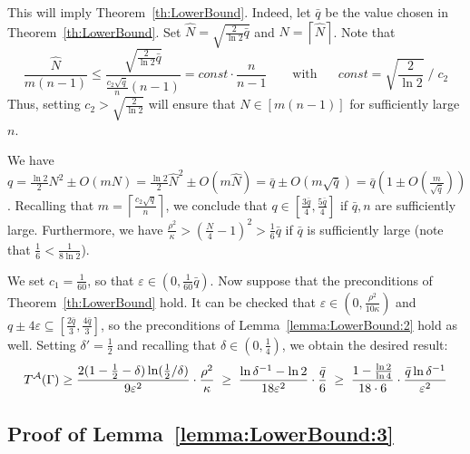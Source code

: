 \documentclass[final,12pt]{colt2018}
\def\calA{{\cal A}}
\begin{document}
This will imply Theorem~\ref{th:LowerBound}.
Indeed, let $\bar q$ be the value chosen in Theorem~\ref{th:LowerBound}.
Set $\hat N=\sqrt{\frac{2}{\ln 2}\bar q}$ and
    $N=\left\lceil {\hat N} \right\rceil$. 
Note that
$$
\frac{\hat N}{m(n-1)} \le \frac{\sqrt{\frac{2}{\ln 2}\bar q}}{\frac{c_2\sqrt{\bar q}}{n}(n-1)}
= const\cdot \frac{n}{n-1} \mbox{~~~~~~with~~~~~}const  =      \mbox{$\sqrt{   \frac{2}{\ln 2}  }$} \; / \; c_2
$$
Thus, setting $c_2 > \sqrt{   \frac{2}{\ln 2}  }$ will ensure that $N\in[m(n-1)]$ for sufficiently large $n$.



We have $q=\frac{\ln 2}2 N^2 \pm O(mN)=\frac{\ln 2}2 \hat N^2 \pm O(m\hat N)=\bar q\pm O(m \sqrt{\bar q})=\bar q\left(1\pm O\left(\frac{m}{\sqrt{\bar q}}\right)\right)$.
Recalling that $m=\left\lceil \frac{c_2\sqrt{q}}{n} \right\rceil$, we
conclude that 
$q\in\left[\frac{3\bar q}{4},\frac{5\bar q}{4}\right]$ if $\bar q,n$ are sufficiently large.
Furthermore, we have $\frac{\rho^2}{\kappa}>(\frac{N}4-1)^2>\frac 16 \bar q$ if $\bar q$ is sufficiently large
(note that $\frac 16<\frac{1}{8\ln 2}$).

We set $c_1=\frac{1}{60}$, so that $\varepsilon\in(0,\frac{1}{60}\bar q)$. Now suppose that the preconditions of Theorem~\ref{th:LowerBound} hold.
It can be checked that $\varepsilon\in (0,\frac{\rho^2}{10\kappa})$ and $q\pm 4\varepsilon\subseteq \left[\frac{2\bar q}3,\frac{4\bar q}3\right]$,
so the preconditions of Lemma~\ref{lemma:LowerBound:2} hold as well.
Setting $\delta'=\frac{1}{2}$ and recalling that $\delta\in(0,\frac{1}{4})$, we obtain the desired result:
$$
T^\calA(\Gamma)\ge \frac{2(1-\frac{1}{2}-\delta)\ln (\frac{1}{2}/\delta)}{9\varepsilon^2}\cdot \frac{\rho^2}{\kappa}
\;\ge\;\frac{\ln \delta^{-1}-\ln 2}{18\varepsilon^2}\cdot \frac{\bar q}6
\;\ge\;\frac{1-\frac{\ln 2}{\ln 4}}{18\cdot 6}\cdot \frac{\bar q\ln \delta^{-1}}{\varepsilon^2}
$$





\subsection{Proof of Lemma~\ref{lemma:LowerBound:3}}\label{sec:lemma:LowerBound:3}
\end{document}
